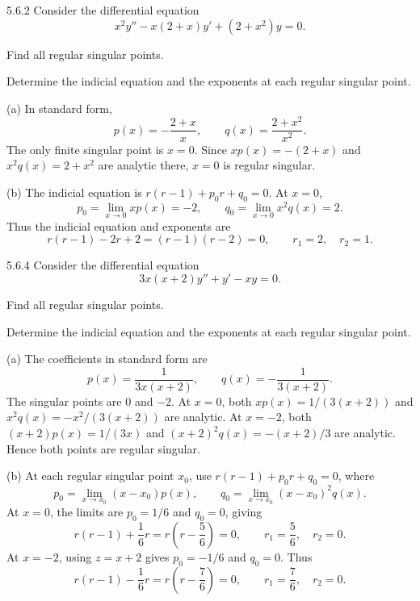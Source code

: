 \documentclass[11pt,oneside]{article}
\begin{document}
\begin{problem}{5.6.2}
Consider the differential equation
\[
    x^2y''-x(2+x)y'+(2+x^2)y=0.
\]
\begin{problemsubparts}
    \item Find all regular singular points.
    \item Determine the indicial equation and the exponents at each regular singular point.
\end{problemsubparts}
\end{problem}

\begin{solution}
\noindent\textup{(a)} In standard form,
\[
    p(x)=-\frac{2+x}{x}, \qquad q(x)=\frac{2+x^2}{x^2}.
\]
The only finite singular point is $x=0$. Since $xp(x)=-(2+x)$ and $x^2q(x)=2+x^2$ are analytic there, $x=0$ is regular singular.

\noindent\textup{(b)} The indicial equation is $r(r-1)+p_0r+q_0=0$. At $x=0$,
\[
    p_0=\lim_{x\to0}xp(x)=-2, \qquad
    q_0=\lim_{x\to0}x^2q(x)=2.
\]
Thus the indicial equation and exponents are
\[
    \boxed{r(r-1)-2r+2=(r-1)(r-2)=0},
    \qquad \boxed{r_1=2, \quad r_2=1}.
\]
\end{solution}

\begin{problem}{5.6.4}
Consider the differential equation
\[
    3x(x+2)y''+y'-xy=0.
\]
\begin{problemsubparts}
    \item Find all regular singular points.
    \item Determine the indicial equation and the exponents at each regular singular point.
\end{problemsubparts}
\end{problem}

\begin{solution}
\noindent\textup{(a)} The coefficients in standard form are
\[
    p(x)=\frac{1}{3x(x+2)}, \qquad
    q(x)=-\frac{1}{3(x+2)}.
\]
The singular points are $0$ and $-2$. At $x=0$, both $xp(x)=1/(3(x+2))$ and $x^2q(x)=-x^2/(3(x+2))$ are analytic. At $x=-2$, both $(x+2)p(x)=1/(3x)$ and $(x+2)^2q(x)=-(x+2)/3$ are analytic. Hence both points are regular singular.

\noindent\textup{(b)} At each regular singular point $x_0$, use $r(r-1)+p_0r+q_0=0$, where
\[
    p_0=\lim_{x\to x_0}(x-x_0)p(x), \qquad
    q_0=\lim_{x\to x_0}(x-x_0)^2q(x).
\]
At $x=0$, the limits are $p_0=1/6$ and $q_0=0$, giving
\[
    \boxed{r(r-1)+\frac16r=r\left(r-\frac56\right)=0},
    \qquad \boxed{r_1=\frac56, \quad r_2=0}.
\]
At $x=-2$, using $z=x+2$ gives $p_0=-1/6$ and $q_0=0$. Thus
\[
    \boxed{r(r-1)-\frac16r=r\left(r-\frac76\right)=0},
    \qquad \boxed{r_1=\frac76, \quad r_2=0}.
\]
\end{solution}
\end{document}

